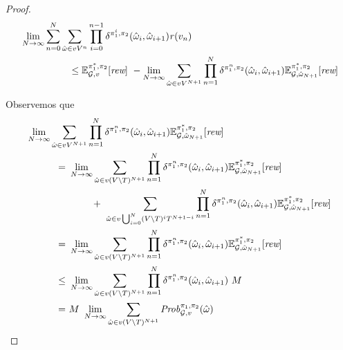 \begin{proof}
  \begin{align}
    & \lim_{N \rightarrow \infty} \sum^{N}_{n=0}\sum_{\hat{\omega} \in vV^{n}} \prod^{n-1}_{i=0}\delta^{\pi_{1}^i,\pi_{2}}(\hat{\omega}_i, \hat{\omega}_{i+1}) \mathit{r}(v_n) \label{thm:semimarkov-to-memoryless-eq0}\\
    & \hspace{5em} \leq 
      \mathbb{E}^{\pi^*_{1}, \pi_{2}}_{\mathcal{G},v}[\textit{rew}] \ - \lim_{N \rightarrow \infty} \sum_{\hat{\omega} \in vV^{N+1}}\prod^{N}_{n=1}\delta^{\pi_{1}^n,\pi_{2}}(\hat{\omega}_i,\hat{\omega}_{i+1}) \mathbb{E}^{\pi^*_{1}, \pi_{2}}_{\mathcal{G}, \hat{\omega}_{N+1}}[\textit{rew}] \notag
  \end{align}

  Observemos que
  \begin{align}
    \lim_{N \rightarrow \infty} \sum_{\hat{\omega} \in vV^{N+1}}\prod^{N}_{n=1}\delta^{\strat{1}^n,\strat{2}}(\hat{\omega}_i,\hat{\omega}_{i+1}) \Expect{\starredstrat{1}}{\strat{2}}_{\StochG, \hat{\omega}_{N+1}}[\Rewards] \hspace{-16em} & \notag \\
    = \ & \lim_{N \rightarrow \infty} \sum_{\hat{\omega} \in v(V\setminus T)^{N+1}}\prod^{N}_{n=1}\delta^{\strat{1}^n,\strat{2}}(\hat{\omega}_i,\hat{\omega}_{i+1}) \Expect{\starredstrat{1}}{\strat{2}}_{\StochG, \hat{\omega}_{N+1}}[\Rewards] \label{thm:semimarkov-to-memoryless-lim-eq1}\\
    & \phantom{\lim_{N \rightarrow \infty}} + \
    \sum_{\hat{\omega} \in v\bigcup_{i=0}^N(V\setminus T)^iT^{N+1-i}}\prod^{N}_{n=1}\delta^{\strat{1}^n,\strat{2}}(\hat{\omega}_i,\hat{\omega}_{i+1}) \Expect{\starredstrat{1}}{\strat{2}}_{\StochG, \hat{\omega}_{N+1}}[\Rewards] \notag \\
    = \ & \lim_{N \rightarrow \infty} \sum_{\hat{\omega} \in v(V\setminus T)^{N+1}}\prod^{N}_{n=1}\delta^{\strat{1}^n,\strat{2}}(\hat{\omega}_i,\hat{\omega}_{i+1}) \Expect{\starredstrat{1}}{\strat{2}}_{\StochG, \hat{\omega}_{N+1}}[\Rewards] \label{thm:semimarkov-to-memoryless-lim-eq2}\\
    \leq \ & \lim_{N \rightarrow \infty} \sum_{\hat{\omega} \in v(V\setminus T)^{N+1}}\prod^{N}_{n=1}\delta^{\strat{1}^n,\strat{2}}(\hat{\omega}_i,\hat{\omega}_{i+1}) \ M \label{thm:semimarkov-to-memoryless-lim-eq3}\\
    = \ & M \ \lim_{N \rightarrow \infty} \sum_{\hat{\omega} \in v(V\setminus T)^{N+1}} \Prob{\strat{1}}{\strat{2}}_{\StochG,v}(\hat{\omega}) \label{thm:semimarkov-to-memoryless-lim-eq4}\\

\end{align}
\end{proof}

